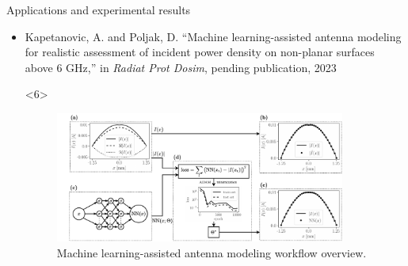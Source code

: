 \documentclass[xcolor=dvipsnames,10pt]{beamer}
\begin{document}
\begin{frame}{Applications and experimental results}
\begin{onlyenv}
\begin{itemize}
\begin{onlyenv}
\begin{figure}
                    \caption{IPD averaged on the adult and child head as a function of the separation distance at different frequencies compared to a reference flat evaluation surface.}
                \end{figure}
            \end{onlyenv}
            \begin{onlyenv}<5>
                \begin{itemize}
                    \item assessment of the spatially averaged IPD on a spherical human head model at \SIlist{2.4;5;10}{\GHz}
                    \item the effect of the curvature of the average adult and child head on spatially averaged IPD
                    \item stochastic analysis indicate marginal difference between models
                    \item comparative analysis of the spatially averaged IPD on highly curved and almost flat body parts -- relative differences of up to \SI{20}{\percent}
                    \item spherical head models yield significantly higher values of the spatially averaged IPD (up to \SI{25}{\percent}) compared to standard planar tissue models
                \end{itemize}
            \end{onlyenv}
            \item<only@6,7> Kapetanovic, A. and Poljak, D. ``Machine learning-assisted antenna modeling for realistic assessment of incident power density on non-planar surfaces above 6 GHz,'' in \textit{Radiat Prot Dosim}, pending publication, 2023
            \begin{onlyenv}<6>
                \begin{figure}
                    \centering
                    \includegraphics[width=0.9\textwidth]{figures/Kapetanovic2023RPD.pdf}
                    \caption{Machine learning-assisted antenna modeling workflow overview.}

\end{figure}
\end{onlyenv}
\end{itemize}
\end{onlyenv}
\end{frame}
\end{document}
